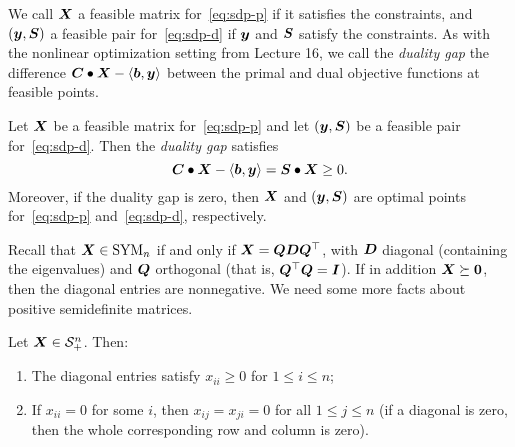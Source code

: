 We call $\bm{X}$ a feasible matrix for~\eqref{eq:sdp-p} if it satisfies the constraints, and $(\bm{y},\bm{S})$ a feasible pair for~\eqref{eq:sdp-d} if $\bm{y}$ and $\bm{S}$ satisfy the constraints. As with the nonlinear optimization setting from Lecture 16, we call the {\em duality gap} the difference $\bm{C}\bullet \bm{X}-\langle {\bm{b}}, {\bm{y}} \rangle$ between the primal and dual objective functions at feasible points.

\begin{theorem}\label{thm:1}
 Let $\bm{X}$ be a feasible matrix for~\eqref{eq:sdp-p} and let $(\bm{y},\bm{S})$ be a feasible pair for~\eqref{eq:sdp-d}. Then the {\em duality gap} satisfies
 \begin{equation*}
  \bm{C}\bullet \bm{X}-\langle {\bm{b}}, {\bm{y}} \rangle = \bm{S}\bullet \bm{X}\geq 0.
 \end{equation*}
Moreover, if the duality gap is zero, then $\bm{X}$ and $(\bm{y},\bm{S})$ are optimal points for~\eqref{eq:sdp-p} and~\eqref{eq:sdp-d}, respectively.
\end{theorem}

Recall that $\bm{X}\in \mathrm{SYM}_n$ if and only if $\bm{X}=\bm{Q}\bm{D}\bm{Q}^{\top}$, with $\bm{D}$ diagonal (containing the eigenvalues) and $\bm{Q}$ orthogonal (that is, $\bm{Q}^{\top}\bm{Q}=\bm{I}$). If in addition $\bm{X}\succeq \bm{0}$, then the diagonal entries 
are nonnegative. We need some more facts about positive semidefinite matrices.

\begin{lemma}\label{le:1}
Let $\bm{X}\in \mathcal{S}^n_{+}$. Then:
\begin{enumerate}
 \item The diagonal entries satisfy $x_{ii}\geq 0$ for $1\leq i\leq n$;
 \item If $x_{ii}=0$ for some $i$, then $x_{ij}=x_{ji}=0$ for all $1\leq j\leq n$ (if a diagonal is zero, then the whole corresponding row and column is zero).
\end{enumerate}
\end{lemma}

